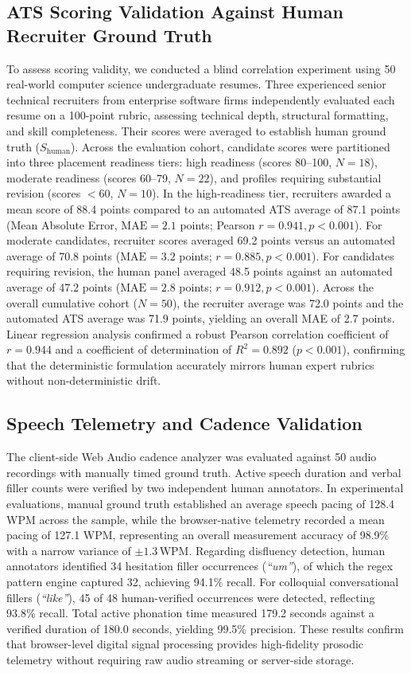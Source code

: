 \documentclass[conference]{IEEEtran}
\begin{document}
\subsection{ATS Scoring Validation Against Human Recruiter Ground Truth}
To assess scoring validity, we conducted a blind correlation experiment using 50 real-world computer science undergraduate resumes. Three experienced senior technical recruiters from enterprise software firms independently evaluated each resume on a 100-point rubric, assessing technical depth, structural formatting, and skill completeness. Their scores were averaged to establish human ground truth ($S_{\mathrm{human}}$). Across the evaluation cohort, candidate scores were partitioned into three placement readiness tiers: high readiness (scores 80--100, $N=18$), moderate readiness (scores 60--79, $N=22$), and profiles requiring substantial revision (scores $<60$, $N=10$). In the high-readiness tier, recruiters awarded a mean score of 88.4 points compared to an automated ATS average of 87.1 points (Mean Absolute Error, $\text{MAE} = 2.1$ points; Pearson $r = 0.941, p < 0.001$). For moderate candidates, recruiter scores averaged 69.2 points versus an automated average of 70.8 points ($\text{MAE} = 3.2$ points; $r = 0.885, p < 0.001$). For candidates requiring revision, the human panel averaged 48.5 points against an automated average of 47.2 points ($\text{MAE} = 2.8$ points; $r = 0.912, p < 0.001$). Across the overall cumulative cohort ($N=50$), the recruiter average was 72.0 points and the automated ATS average was 71.9 points, yielding an overall MAE of 2.7 points. Linear regression analysis confirmed a robust Pearson correlation coefficient of $r = 0.944$ and a coefficient of determination of $R^2 = 0.892$ ($p < 0.001$), confirming that the deterministic formulation accurately mirrors human expert rubrics without non-deterministic drift.

\subsection{Speech Telemetry and Cadence Validation}
The client-side Web Audio cadence analyzer was evaluated against 50 audio recordings with manually timed ground truth. Active speech duration and verbal filler counts were verified by two independent human annotators. In experimental evaluations, manual ground truth established an average speech pacing of 128.4 WPM across the sample, while the browser-native telemetry recorded a mean pacing of 127.1 WPM, representing an overall measurement accuracy of 98.9\% with a narrow variance of $\pm 1.3$\,WPM. Regarding disfluency detection, human annotators identified 34 hesitation filler occurrences (\textit{``um''}), of which the regex pattern engine captured 32, achieving 94.1\% recall. For colloquial conversational fillers (\textit{``like''}), 45 of 48 human-verified occurrences were detected, reflecting 93.8\% recall. Total active phonation time measured 179.2 seconds against a verified duration of 180.0 seconds, yielding 99.5\% precision. These results confirm that browser-level digital signal processing provides high-fidelity prosodic telemetry without requiring raw audio streaming or server-side storage.
\end{document}
